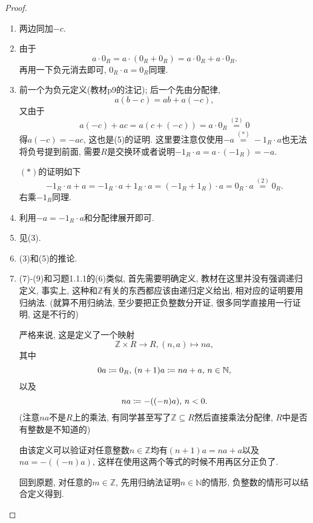 \documentclass{../solutions-cn}
\begin{document}
\begin{proof}
    \begin{enumerate}[(1)]
        \item 两边同加$-c$.
        \item 由于
        \[
            a \cdot 0_R = a \cdot (0_R + 0_R) = a \cdot 0_R + a \cdot 0_R.
        \]
        再用一下负元消去即可, $0_R \cdot a = 0_R$同理.
        \item 前一个为负元定义(教材p9的注记); 后一个先由分配律, 
        \[
            a(b - c) = ab + a(-c),
        \]
        又由于
        \[
            a(-c) + ac = a(c + (-c)) = a \cdot 0_R \overset{(2)}= 0
        \]
        得$a(-c) = -ac$, 这也是(5)的证明. 这里要注意仅使用$-a \overset{(*)}= -1_R \cdot a$也无法将负号提到前面, 需要$R$是交换环或者说明$-1_R \cdot a = a \cdot (-1_R) = -a$.
        
        $(*)$的证明如下
        \[
            -1_R \cdot a + a = -1_R \cdot a + 1_R \cdot a = (-1_R + 1_R) \cdot a = 0_R \cdot a \overset{(2)}= 0_R.
        \]
        右乘$-1_R$同理.
        \item 利用$-a = -1_R \cdot a$和分配律展开即可.
        \item 见(3).
        \item (3)和(5)的推论.
        \item (7)-(9)和习题1.1.1的(6)类似, 首先需要明确定义, 教材在这里并没有强调递归定义, 事实上, 这种和$\mathbb{Z}$有关的东西都应该由递归定义给出, 相对应的证明要用归纳法. (就算不用归纳法, 至少要把正负整数分开证, 很多同学直接用一行证明, 这是不行的)

        严格来说, 这是定义了一个映射
        \[
            \mathbb{Z} \times R \to R, (n, a) \mapsto na,
        \]
        其中
        \[
            0a \mathrel{\coloneqq} 0_R,\, (n + 1)a \mathrel{\coloneqq} na + a,\, n \in \mathbb{N},
        \]
        以及
        \[
            na \mathrel{\coloneqq} -((-n)a),\, n < 0.
        \]
        (注意$na$不是$R$上的乘法, 有同学甚至写了$\mathbb{Z} \subseteq R$然后直接乘法分配律, $R$中是否有整数是不知道的)

        由该定义可以验证对任意整数$n \in \mathbb{Z}$均有$(n + 1)a = na + a$以及$na = -((-n)a)$, 这样在使用这两个等式的时候不用再区分正负了.

        回到原题, 对任意的$m \in \mathbb{Z}$, 先用归纳法证明$n \in \mathbb{N}$的情形, 负整数的情形可以结合定义得到.


\end{enumerate}
\end{proof}
\end{document}
